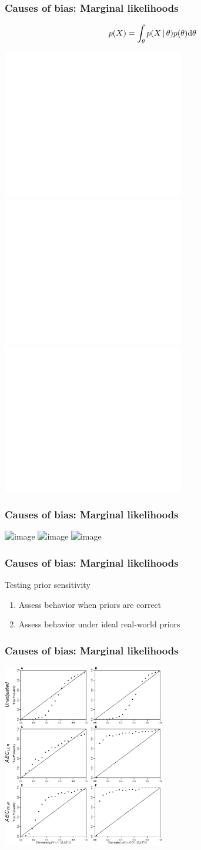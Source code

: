 \begin{frame}
    \frametitle{Causes of bias: Marginal likelihoods}
    \begin{displaybox}[5.5cm]
        \small
        \[
            p(X) = \int_{\theta} p(X
            \,|\, \theta) p(\theta) \mathrm{d}\theta
        \]%
    \end{displaybox}
    \smallskip
    \centerline{
        \includegraphics<1>[height=6.5cm]{images/marginal-plot-2d-no-priors.pdf}
        \includegraphics<2>[height=6.5cm]{images/marginal-plot-2d-uniform-prior.pdf}
        \includegraphics<3>[height=6.5cm]{images/marginal-plot-2d.pdf}}
\end{frame}

\begin{frame}
    \frametitle{Causes of bias: Marginal likelihoods}
    \centerline{
        \includegraphics<1>[height=8.0cm]{images/marginal-plot-3d-bare.png}
        \includegraphics<2>[height=8.0cm]{images/marginal-plot-3d-prior.png}
        \includegraphics<3>[height=8.0cm]{images/marginal-plot-3d.png}}
\end{frame}

\begin{frame}
    \frametitle{Causes of bias: Marginal likelihoods}
    Testing prior sensitivity \\
    \begin{enumerate}
        \item Assess behavior when priors are correct
        \item Assess behavior under ideal real-world priors
    \end{enumerate}
\end{frame}

\begin{frame}
    \frametitle{Causes of bias: Marginal likelihoods}
    \centerline{
    \includegraphics[height=8cm]{images/posterior_vs_true_prob.pdf}}
\end{frame}

